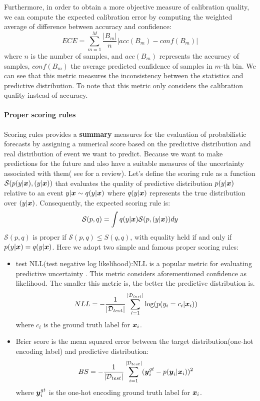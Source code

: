Furthermore, in order to obtain a more objective measure of calibration quality, we can compute the expected calibration error by computing the weighted average of difference between accuracy and confidence:
\begin{equation}
ECE = \sum_{m=1}^{M}\frac{|B_m|}{n}|acc(B_m) - conf(B_m)|
\end{equation}
where $n$ is the number of samples, and $acc(B_m)$ represents the accuracy of samples, $conf(B_m)$ the average predicted confidence of samples in $m$-th bin. We can see that this metric measures the inconsistency between the statistics and predictive distribution. To note that this metric only considers the calibration quality instead of accuracy. 


\paragraph{Proper scoring rules} 
Scoring rules provides a \textbf{summary} measures for the evaluation of probabilistic forecasts by assigning a numerical score based on the predictive distribution and real distribution of event we want to predict. Because we want to make predictions for the future and also have a suitable measures of the uncertainty associated with them(  see \cite{gneiting2007strictly} for a review). Let's define the scoring rule as a function $\mathcal S(p(y|\boldsymbol x), (y|\boldsymbol x))$ that evaluates the quality of predictive distribution $p(y|\boldsymbol x)$ relative to an event $y|\boldsymbol x \sim q(y|\boldsymbol x)$ where $q(y|\boldsymbol x)$ represents the true distribution over $(y|\boldsymbol x)$. Consequently, the expected scoring rule is:
\begin{equation}\label{scoring rule}
	\mathcal S(p, q) = \int q(y| \boldsymbol x) \mathcal S(p,(y|\boldsymbol x))dy
\end{equation}
$\mathcal S(p,q)$ is proper if $\mathcal S(p,q) \leq S(q,q)$, with equality held if and only if $p(y|\boldsymbol x) = q(y|\boldsymbol x)$. Here we adopt two simple and famous proper scoring rules:
\begin{itemize}
	\item test NLL(test negative log likelihood):NLL is a popular metric for evaluating predictive uncertainty	\cite{quinonero2005evaluating}. This metric considers aforementioned confidence as likelihood. The smaller this metric is, the better the predictive distribution is.
	\begin{equation} \label{nll}
		NLL = -\frac{1}{|\mathcal D_{test}|}\sum_{i=1}^{|\mathcal D_{test}|}\text{log}(p(y_i = c_i|\boldsymbol x_i))
	\end{equation}
	where $c_i$ is the ground truth label for $\boldsymbol x_i$.	
	\item Brier score is the mean squared error between the target distribution(one-hot encoding label) and predictive distribution:
	\begin{equation} \label{bs}
	BS = -\frac{1}{|\mathcal D_{test}|}\sum_{i=1}^{|\mathcal D_{test}|}(\boldsymbol y^{gt}_i - p(\boldsymbol y_i|\boldsymbol x_i))^2
	\end{equation}
	where $\boldsymbol y^{gt}_i$ is the one-hot encoding ground truth label for $\boldsymbol x_i$. 
	
\end{itemize}

